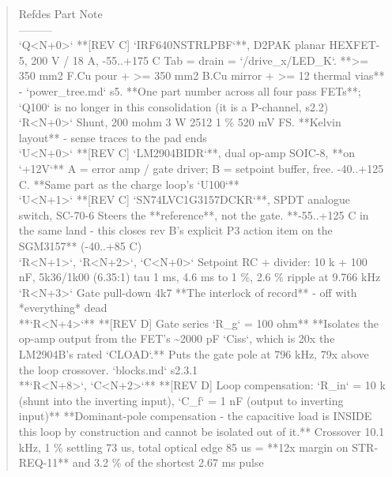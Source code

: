 \documentclass[11pt,a4paper]{article}
\begin{document}
\begin{quote}\small\ttfamily\raggedright
\textbar{} Refdes \textbar{} Part \textbar{} Note \textbar{}\\
\textbar{}---\textbar{}---\textbar{}---\textbar{}\\
\textbar{} `Q\textless{}N+0\textgreater{}` \textbar{} {*}{*}{[}REV C{]} `IRF640NSTRLPBF`{*}{*}, D2PAK planar HEXFET-5, 200 V / 18 A, -55..+175 C \textbar{} Tab = drain = `/drive\_x/LED\_K`. {*}{*}\textgreater{}= 350 mm2 F.Cu pour + \textgreater{}= 350 mm2 B.Cu mirror + \textgreater{}= 12 thermal vias{*}{*} - `power\_tree.md` s5. {*}{*}One part number across all four pass FETs{*}{*}; `Q100` is no longer in this consolidation (it is a P-channel, s2.2) \textbar{}\\
\textbar{} `R\textless{}N+0\textgreater{}` \textbar{} Shunt, 200 mohm 3 W 2512 1 \% \textbar{} 520 mV FS. {*}{*}Kelvin layout{*}{*} - sense traces to the pad ends \textbar{}\\
\textbar{} `U\textless{}N+0\textgreater{}` \textbar{} {*}{*}{[}REV C{]} `LM2904BIDR`{*}{*}, dual op-amp SOIC-8, {*}{*}on `+12V`{*}{*} \textbar{} A = error amp / gate driver; B = setpoint buffer, free. -40..+125 C. {*}{*}Same part as the charge loop's `U100`{*}{*} \textbar{}\\
\textbar{} `U\textless{}N+1\textgreater{}` \textbar{} {*}{*}{[}REV C{]} `SN74LVC1G3157DCKR`{*}{*}, SPDT analogue switch, SC-70-6 \textbar{} Steers the {*}{*}reference{*}{*}, not the gate. {*}{*}-55..+125 C in the same land - this closes rev B's explicit P3 action item on the SGM3157{*}{*} (-40..+85 C) \textbar{}\\
\textbar{} `R\textless{}N+1\textgreater{}`, `R\textless{}N+2\textgreater{}`, `C\textless{}N+0\textgreater{}` \textbar{} Setpoint RC + divider: 10 k + 100 nF, 5k36/1k00 (6.35:1) \textbar{} tau 1 ms, 4.6 ms to 1 \%, 2.6 \% ripple at 9.766 kHz \textbar{}\\
\textbar{} `R\textless{}N+3\textgreater{}` \textbar{} Gate pull-down 4k7 \textbar{} {*}{*}The interlock of record{*}{*} - off with {*}everything{*} dead \textbar{}\\
\textbar{} {*}{*}`R\textless{}N+4\textgreater{}`{*}{*} \textbar{} {*}{*}{[}REV D{]} Gate series `R\_g` = 100 ohm{*}{*} \textbar{} {*}{*}Isolates the op-amp output from the FET's \textasciitilde{}2000 pF `Ciss`, which is 20x the LM2904B's rated `CLOAD`.{*}{*} Puts the gate pole at 796 kHz, 79x above the loop crossover. `blocks.md` s2.3.1 \textbar{}\\
\textbar{} {*}{*}`R\textless{}N+8\textgreater{}`, `C\textless{}N+2\textgreater{}`{*}{*} \textbar{} {*}{*}{[}REV D{]} Loop compensation: `R\_in` = 10 k (shunt into the inverting input), `C\_f` = 1 nF (output to inverting input){*}{*} \textbar{} {*}{*}Dominant-pole compensation - the capacitive load is INSIDE this loop by construction and cannot be isolated out of it.{*}{*} Crossover 10.1 kHz, 1 \% settling 73 us, total optical edge 85 us = {*}{*}12x margin on STR-REQ-11{*}{*} and 3.2 \% of the shortest 2.67 ms pulse \textbar{}\\

\end{quote}
\end{document}
